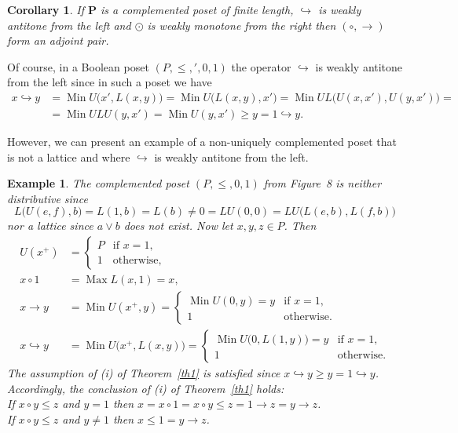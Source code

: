 \documentclass[12pt]{article}
\DeclareMathOperator{\Max}{Max}
\DeclareMathOperator{\Min}{Min}
\newtheorem{example}[theorem]{Example}
\newtheorem{corollary}[theorem]{Corollary}
\begin{document}
\begin{corollary}
If $\mathbf P$ is a complemented poset of finite length, $\hookrightarrow$ is weakly antitone from the left and $\odot$ is weakly monotone from the right then $(\circ,\to)$ form an adjoint pair.
\end{corollary}

Of course, in a Boolean poset $(P,\le,{}',0,1)$ the operator $\hookrightarrow$ is weakly antitone from the left since in such a poset we have
\begin{align*}
x\hookrightarrow y & =\Min U\big(x',L(x,y)\big)=\Min U\big(L(x,y),x'\big)=\Min UL\big(U(x,x'),U(y,x')\big)= \\
                   & =\Min ULU(y,x')=\Min U(y,x')\ge y=1\hookrightarrow y.
\end{align*}

However, we can present an example of a non-uniquely complemented poset that is not a lattice and where $\hookrightarrow$ is weakly antitone from the left.

\begin{example}
The complemented poset $(P,\le,0,1)$ from Figure~8 is neither distributive since
\[
L\big(U(e,f),b\big)=L(1,b)=L(b)\ne0=LU(0,0)=LU\big(L(e,b),L(f,b)\big)
\]
nor a lattice since $a\vee b$ does not exist. Now let $x,y,z\in P$. Then
\begin{align*}
            U(x^+) & =\left\{
\begin{array}{ll}
P & \text{if }x=1, \\
1 & \text{otherwise},
\end{array}
\right. \\
           x\circ1 & =\Max L(x,1)=x, \\
            x\to y & =\Min U(x^+,y)=\left\{
\begin{array}{ll}
\Min U(0,y)=y & \text{if }x=1, \\
1             & \text{otherwise}.
\end{array}
\right. \\
x\hookrightarrow y & =\Min U\big(x^+,L(x,y)\big)=\left\{
\begin{array}{ll}
\Min U\big(0,L(1,y)\big)=y & \text{if }x=1, \\
1                          & \text{otherwise}.
\end{array}
\right.
\end{align*}
The assumption of {\rm(i)} of Theorem~\ref{th1} is satisfied since $x\hookrightarrow y\ge y=1\hookrightarrow y$. Accordingly, the conclusion of {\rm(i)} of Theorem~\ref{th1} holds: \\
If $x\circ y\le z$ and $y=1$ then $x=x\circ1=x\circ y\le z=1\to z=y\to z$. \\
If $x\circ y\le z$ and $y\ne1$ then $x\le1=y\to z$.
\end{example}
\end{document}
